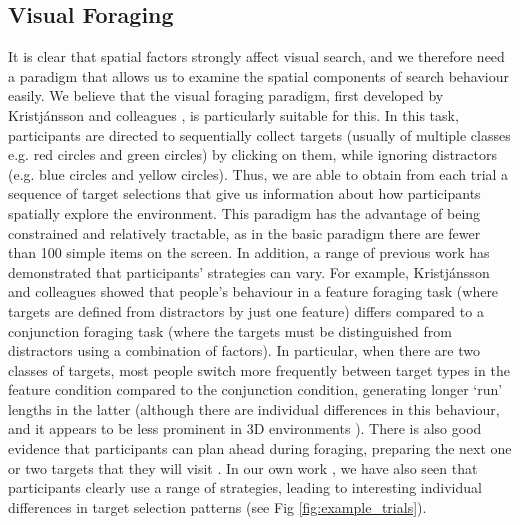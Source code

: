 \documentclass[man, floatsintext]{apa7}
\begin{document}
\subsection{Visual Foraging}

It is clear that spatial factors strongly affect visual search, and we therefore need a paradigm that allows us to examine the spatial components of search behaviour easily. We believe that the visual foraging paradigm, first developed by Kristj{\'a}nsson and colleagues \cite{kristjansson2014}, is particularly suitable for this. In this task, participants are directed to sequentially collect targets (usually of multiple classes e.g. red circles and green circles) by clicking on them, while ignoring distractors (e.g. blue circles and yellow circles). Thus, we are able to obtain from each trial a sequence of target selections that give us information about how participants spatially explore the environment. This paradigm has the advantage of being constrained and relatively tractable, as in the basic paradigm there are fewer than 100 simple items on the screen. In addition, a range of previous work has demonstrated that participants' strategies can vary. For example, Kristj{\'a}nsson and colleagues \cite{kristjansson2014} showed that people's behaviour in a feature foraging task (where targets are defined from distractors by just one feature) differs compared to a conjunction foraging task (where the targets must be distinguished from distractors using a combination of factors). In particular, when there are two classes of targets, most people switch more frequently between target types in the feature condition compared to the conjunction condition, generating longer `run' lengths in the latter (although there are individual differences in this behaviour, and it appears to be less prominent in 3D environments \citep{kristjansson2020, prpic2019serious}). There is also good evidence that participants can plan ahead during foraging, preparing the next one or two targets that they will visit \citep{kosovicheva2020looking, thornton2004multi}. In our own work \citep{clarke2022qjep}, we have also seen that participants clearly use a range of strategies, leading to interesting individual differences in target selection patterns (see Fig \ref{fig:example_trials}).
\end{document}
